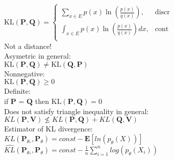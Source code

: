 $ \text {KL}(\mathbf{P}, \mathbf{Q}) =
	\begin{cases}
		  \sum _{x \in E} p(x) \ln \left( \frac{p(x)}{q(x)} \right),&\text{discr}\\
		 
		{\int }_{x \in E} p(x) \ln \left( \frac{p(x)}{q(x)}\right)dx,&\text{cont}\\
	\end{cases}
$\\
Not a distance!\\
Asymetric in general:\\
$\text {KL}(\mathbf{P}, \mathbf{Q}) \neq \text {KL}(\mathbf{Q}, \mathbf{P})$\\
Nonnegative:\\
$\text {KL}(\mathbf{P}, \mathbf{Q}) \geq 0$\\
Definite:\\
if $\mathbf{P}$ = $\mathbf{Q}$ then $\text {KL}(\mathbf{P}, \mathbf{Q}) = 0$\\
Does not satisfy triangle inequality in general:\\
$KL(\mathbf{P}, \mathbf{V}) \nleq KL(\mathbf{P}, \mathbf{Q}) + KL(\mathbf{Q}, \mathbf{V})$\\

Estimator of KL divergence:\\
$KL(\mathbf{P}_{\theta_{*}},\mathbf{P}_{\theta}) = const - \mathbf{E}[ln(p_{\theta}(X))]$ \\

$\widehat{KL}(\mathbf{P}_{\theta_{*}},\mathbf{P}_{\theta}) = const - \frac{1}{n} \sum_{i=1}^{n} log(p_{\theta}(X_i))$ 